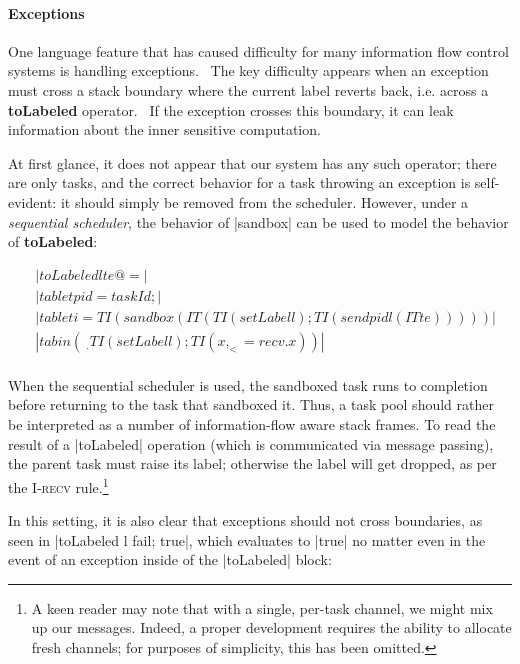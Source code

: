\paragraph{Exceptions}  One language feature that has caused difficulty
for many information flow control systems is handling
exceptions.~\cite{Hritcu:2013:YIB:2497621.2498098}  The key difficulty
appears when an exception must cross a stack boundary where the current
label reverts back, i.e. across a \textbf{toLabeled} operator.~\cite{lio}
If the exception crosses this boundary, it can leak information about the
inner sensitive computation.

At first glance, it does not appear that our system has any such operator;
there are only tasks, and the correct behavior for a task throwing
an exception is self-evident: it should simply be removed from the scheduler.
However, under a \emph{sequential scheduler}, the behavior of |sandbox|
can be used to model the behavior of \textbf{toLabeled}:

\begin{align*}
    & |toLabeled l te @= | \\
    & |tab let pid = taskId; | \\
    & |tab let i = TI (sandbox (IT (TI (setLabel l); TI (send pid l (IT te)))))| \\
    & |tab in (\ _ . TI (setLabel l); TI ( x, _ <= recv . x ))| \\
\end{align*}

When the sequential scheduler is used, the sandboxed task runs to
completion before returning to the task that sandboxed it.  Thus,
a task pool should rather be interpreted as a number of information-flow
aware stack frames.  To read the result of a |toLabeled| operation
(which is communicated via message passing), the parent task must raise
its label; otherwise the label will get dropped, as per the \textsc{I-recv} rule.\footnote{A keen reader may note that with a single, per-task
channel, we might mix up our messages.  Indeed, a proper development requires
the ability to allocate fresh channels; for purposes of simplicity, this
has been omitted.}

In this setting, it is also clear that exceptions should not cross boundaries,
as seen in |toLabeled l fail; true|, which evaluates to |true| no matter even in
the event of an exception inside of the |toLabeled| block:







